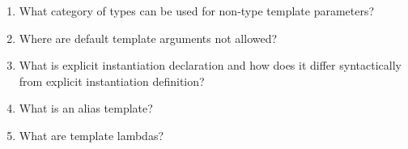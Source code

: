 \begin{enumerate}
\item
What category of types can be used for non-type template parameters?

\item
Where are default template arguments not allowed?

\item
What is explicit instantiation declaration and how does it differ syntactically from explicit instantiation definition?

\item
What is an alias template?

\item
What are template lambdas?
\end{enumerate}